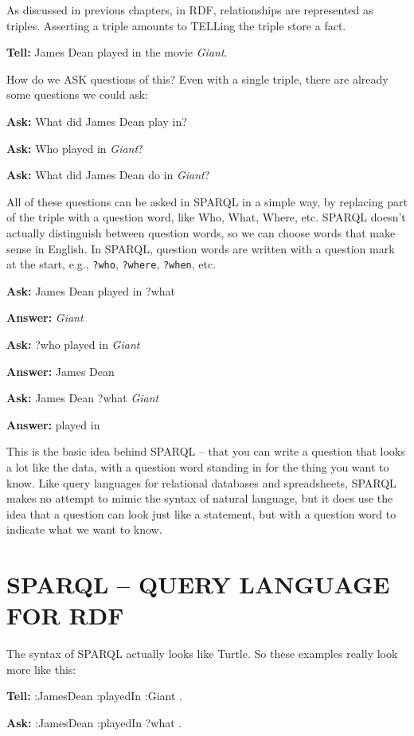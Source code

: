 As discussed in previous chapters, in RDF, relationships are represented
as triples. Asserting a triple amounts to TELLing the triple store a
fact.

\textbf{Tell:} James Dean played in the movie \emph{Giant}.

How do we ASK questions of this? Even with a single triple, there are
already some questions we could ask:

\textbf{Ask:} What did James Dean play in?

\textbf{Ask:} Who played in \emph{Giant}?

\textbf{Ask:} What did James Dean do in \emph{Giant}?

All of these questions can be asked in SPARQL in a simple way, by
replacing part of the triple with a question word, like Who, What,
Where, etc. SPARQL doesn't actually distinguish between question words,
so we can choose words that make sense in English. In SPARQL, question
words are written with a question mark at the start, e.g., \texttt{?who}, \texttt{?where},
\texttt{?when}, etc.

\textbf{Ask:} James Dean played in ?what

\textbf{Answer:} \emph{Giant}

\textbf{Ask:} ?who played in \emph{Giant}

\textbf{Answer:} James Dean

\textbf{Ask:} James Dean ?what \emph{Giant}

\textbf{Answer:} played in

This is the basic idea behind SPARQL -- that you can write a question
that looks a lot like the data, with a question word standing in for the
thing you want to know. Like query languages for relational databases
and spreadsheets, SPARQL makes no attempt to mimic the syntax of natural
language, but it does use the idea that a question can look just like a
statement, but with a question word to indicate what we want to know.

\section{SPARQL -- QUERY LANGUAGE FOR RDF}

The syntax of SPARQL actually looks like Turtle. So these examples
really look more like this:

\textbf{\textbf{Tell:}} :JamesDean :playedIn :Giant . 

\textbf{\textbf{Ask:}} :JamesDean :playedIn ?what .

